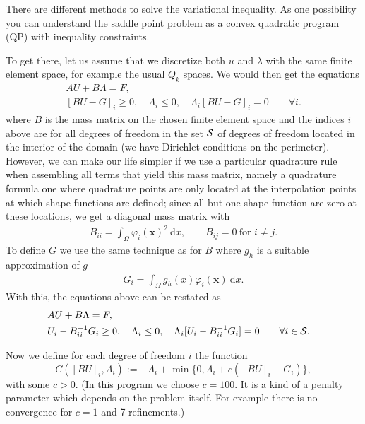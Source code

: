 \documentclass{article}
\begin{document}
There are different methods to solve the variational inequality. As one
possibility you can understand the saddle point problem as a convex quadratic program (QP) with
inequality constraints.

To get there, let us assume that we discretize both $u$ and $\lambda$ with the
same finite element space, for example the usual $Q_k$ spaces. We would then
get the equations
\begin{eqnarray*}
 &A U + B\Lambda = F,&\\
 &[BU-G]_i \geq 0, \quad \Lambda_i \leq 0,\quad \Lambda_i[BU-G]_i = 0
\qquad \forall i.&
\end{eqnarray*}
where $B$ is the mass matrix on the chosen finite element space and the
indices $i$ above are for all degrees of freedom in the set $\cal S$ of degrees of
freedom located in the interior of the domain
(we have Dirichlet conditions on the perimeter). However, we
can make our life simpler if we use a particular quadrature rule when
assembling all terms that yield this mass matrix, namely a quadrature formula
one where quadrature points are only located at the interpolation points at
which shape functions are defined; since all but one shape function are zero
at these locations, we get a diagonal mass matrix with
\begin{align*}
  B_{ii} = \int_\Omega \varphi_i(\mathbf x)^2\ \textrm{d}x,
  \qquad
  B_{ij}=0 \ \text{for } i\neq j.
\end{align*}
To define $G$ we use the same technique as for $B$ where $g_h$ is a
suitable approximation of $g$
\begin{align*}
  G_{i} = \int_\Omega g_h(x) \varphi_i(\mathbf x)\ \textrm{d}x.
\end{align*}
With this, the equations above can be restated as
\begin{eqnarray*}
 &A U + B\Lambda = F,&\\
 &U_i-B_{ii}^{-1}G_i \ge 0, \quad \Lambda_i \leq 0,\quad \Lambda_i[U_i-B_{ii}^{-1}G_i] = 0
\qquad \forall i\in{\cal S}.&
\end{eqnarray*}

Now we define for each degree of freedom $i$ the function
\begin{equation*}
 C([BU]_i,\Lambda_i):=-\Lambda_i + \min\lbrace 0, \Lambda_i + c([BU]_i - G_i) \rbrace,
\end{equation*}
with some $c>0$. (In this program we choose $c = 100$. It is a kind of a penalty parameter which
depends on the problem itself. For example there is no convergence for $c = 1$ and 7 refinements.)
\end{document}
